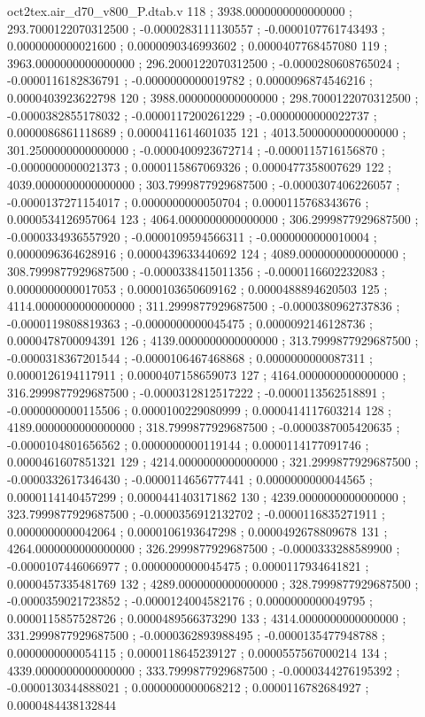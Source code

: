 \begin{filecontents}[overwrite]{oct2tex.air_d70_v800_P.dtab.v}
118 ; 3938.0000000000000000 ; 293.7000122070312500 ; -0.0000283111130557 ; -0.0000107761743493 ; 0.0000000000021600 ; 0.0000090346993602 ; 0.0000407768457080
119 ; 3963.0000000000000000 ; 296.2000122070312500 ; -0.0000280608765024 ; -0.0000116182836791 ; -0.0000000000019782 ; 0.0000096874546216 ; 0.0000403923622798
120 ; 3988.0000000000000000 ; 298.7000122070312500 ; -0.0000382855178032 ; -0.0000117200261229 ; -0.0000000000022737 ; 0.0000086861118689 ; 0.0000411614601035
121 ; 4013.5000000000000000 ; 301.2500000000000000 ; -0.0000400923672714 ; -0.0000115716156870 ; -0.0000000000021373 ; 0.0000115867069326 ; 0.0000477358007629
122 ; 4039.0000000000000000 ; 303.7999877929687500 ; -0.0000307406226057 ; -0.0000137271154017 ; 0.0000000000050704 ; 0.0000115768343676 ; 0.0000534126957064
123 ; 4064.0000000000000000 ; 306.2999877929687500 ; -0.0000334936557920 ; -0.0000109594566311 ; -0.0000000000010004 ; 0.0000096364628916 ; 0.0000439633440692
124 ; 4089.0000000000000000 ; 308.7999877929687500 ; -0.0000338415011356 ; -0.0000116602232083 ; 0.0000000000017053 ; 0.0000103650609162 ; 0.0000488894620503
125 ; 4114.0000000000000000 ; 311.2999877929687500 ; -0.0000380962737836 ; -0.0000119808819363 ; -0.0000000000045475 ; 0.0000092146128736 ; 0.0000478700094391
126 ; 4139.0000000000000000 ; 313.7999877929687500 ; -0.0000318367201544 ; -0.0000106467468868 ; 0.0000000000087311 ; 0.0000126194117911 ; 0.0000407158659073
127 ; 4164.0000000000000000 ; 316.2999877929687500 ; -0.0000312812517222 ; -0.0000113562518891 ; -0.0000000000115506 ; 0.0000100229080999 ; 0.0000414117603214
128 ; 4189.0000000000000000 ; 318.7999877929687500 ; -0.0000387005420635 ; -0.0000104801656562 ; 0.0000000000119144 ; 0.0000114177091746 ; 0.0000461607851321
129 ; 4214.0000000000000000 ; 321.2999877929687500 ; -0.0000332617346430 ; -0.0000114656777441 ; 0.0000000000044565 ; 0.0000114140457299 ; 0.0000441403171862
130 ; 4239.0000000000000000 ; 323.7999877929687500 ; -0.0000356912132702 ; -0.0000116835271911 ; 0.0000000000042064 ; 0.0000106193647298 ; 0.0000492678809678
131 ; 4264.0000000000000000 ; 326.2999877929687500 ; -0.0000333288589900 ; -0.0000107446066977 ; 0.0000000000045475 ; 0.0000117934641821 ; 0.0000457335481769
132 ; 4289.0000000000000000 ; 328.7999877929687500 ; -0.0000359021723852 ; -0.0000124004582176 ; 0.0000000000049795 ; 0.0000115857528726 ; 0.0000489566373290
133 ; 4314.0000000000000000 ; 331.2999877929687500 ; -0.0000362893988495 ; -0.0000135477948788 ; 0.0000000000054115 ; 0.0000118645239127 ; 0.0000557567000214
134 ; 4339.0000000000000000 ; 333.7999877929687500 ; -0.0000344276195392 ; -0.0000130344888021 ; 0.0000000000068212 ; 0.0000116782684927 ; 0.0000484438132844

\end{filecontents}
